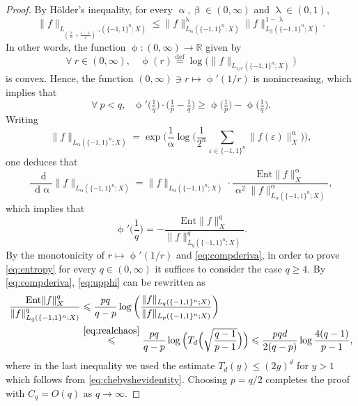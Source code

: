 \documentclass[11pt,reqno]{amsart}
\renewcommand{\leq}{\leqslant}
\renewcommand{\geq}{\geqslant}
\newcommand{\e}{\varepsilon}
\newcommand{\R}{\mathbb R}
\newcommand{\1}{\mathbf 1}
\theoremstyle{remark}
\newcommand{\eqdef}{\stackrel{\mathrm{def}}{=}}
\renewcommand{\lambda}{\uplambda}
\renewcommand{\beta}{\upbeta}
\renewcommand{\alpha}{\upalpha}
\newcommand*\diff{\mathop{}\!\mathrm{d}}
\begin{document}
\begin{proof}
By H\"older's inequality, for every $\alpha,\beta\in(0,\infty)$ and $\lambda\in(0,1)$,
\begin{equation} \label{eq:fancyholder}
\|f\|_{L_{(\frac{\lambda}{\alpha}+\frac{1-\lambda}{\beta})^{-1}}(\{-1,1\}^n;X)} \leq \|f\|_{L_\alpha(\{-1,1\}^n;X)}^\lambda \|f\|_{L_\beta(\{-1,1\}^n;X)}^{1-\lambda}.
\end{equation}
In other words, the function $\upphi:(0,\infty)\to\R$ given by
\begin{equation}
\forall \ r\in(0,\infty), \ \ \ \ \upphi(r)\eqdef \log\big(\|f\|_{L_{1/r}(\{-1,1\}^n;X)}\big)
\end{equation}
is convex. Hence, the function $(0,\infty)\ni r\longmapsto \upphi'(1/r)$ is nonincreasing, which implies that
\begin{equation} \label{eq:upphi}
\forall \ p<q, \ \ \ \upphi'\big(\tfrac{1}{q}\big) \cdot \big( \tfrac{1}{p}-\tfrac{1}{q}\big) \geq \upphi\big(\tfrac{1}{p}\big) - \upphi\big(\tfrac{1}{q}\big).
\end{equation}
Writing
\begin{equation}
\|f\|_{L_\alpha(\{-1,1\}^n;X)} = \exp\Big( \frac{1}{\alpha}\log\Big( \frac{1}{2^n}\sum_{\e\in\{-1,1\}^n} \|f(\e)\|_X^\alpha \Big)\Big),
\end{equation}
one deduces that
\begin{equation}
\frac{\diff}{\diff \alpha} \|f\|_{L_\alpha(\{-1,1\}^n;X)} = \|f\|_{L_\alpha(\{-1,1\}^n;X)} \cdot \frac{\mathrm{Ent}\|f\|_X^\alpha}{\alpha^2\|f\|_{L_\alpha(\{-1,1\}^n;X)}^\alpha},
\end{equation}
which implies that
\begin{equation} \label{eq:compderiva}
\upphi'\Big(\frac{1}{q}\Big) = - \frac{\mathrm{Ent}\|f\|_X^q}{\|f\|_{L_q(\{-1,1\}^n;X)}^q}.
\end{equation}
By the monotonicity of $r\mapsto\upphi'(1/r)$ and \eqref{eq:compderiva}, in order to prove \eqref{eq:entropy} for every $q\in(0,\infty)$ it suffices to consider the case $q\geq4$. By \eqref{eq:compderiva}, \eqref{eq:upphi} can be rewritten as
\begin{equation}
\begin{split}
\frac{\mathrm{Ent}\|f\|_X^q}{\|f\|_{L_q(\{-1,1\}^n;X)}^q} & \leq \frac{pq}{q-p} \log\left(\frac{\|f\|_{L_q(\{-1,1\}^n;X)}}{\|f\|_{L_p(\{-1,1\}^n;X)}}\right) 
\\ & \stackrel{\eqref{eq:realchaos}}{\leq} \frac{pq}{q-p} \log\Big(T_d\Big(\sqrt{\frac{q-1}{p-1}}\Big)\Big) \leq \frac{pqd}{2(q-p)} \log \frac{4(q-1)}{p-1},
\end{split}
\end{equation}
where in the last inequality we used the estimate $T_d(y)\leq (2y)^d$ for $y>1$ which follows from \eqref{eq:chebyshevidentity}. Choosing $p=q/2$ completes the proof with $C_q=O(q)$ as $q\to\infty$.
\end{proof}
\end{document}
